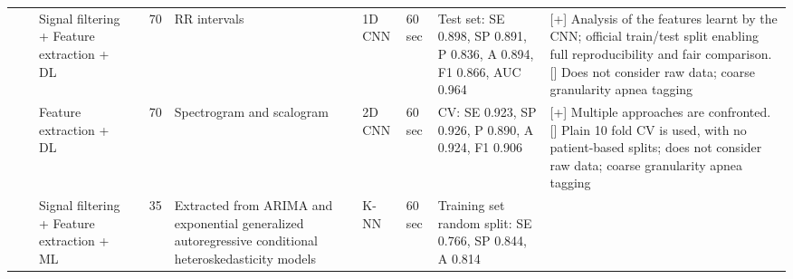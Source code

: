 \documentclass[5p,twocolumn,lefttitle]{elsarticle}
\begin{document}
\begin{table*}[!ht]
{\begin{tabularx}{2\textwidth}{@{}m{2.5em}p{7em}p{10em}lp{2em}p{12em}p{7em}p{3em}p{17em}X@{}}
                            &                                                         & Signal filtering + Feature extraction + DL                     & \cite{shen2021multiscale}                & 70            & RR intervals                                                                                                      & 1D CNN                              & 60 sec                                     & Test set: SE 0.898, SP 0.891, P 0.836, A 0.894, F1 0.866, AUC 0.964                                                                                                                       & [+] Analysis of the features learnt by the CNN; official train/test split enabling full reproducibility and fair comparison. [] Does not consider raw data; coarse granularity apnea tagging                                                                                                                                                                                                                                                           \\
                            
                            \cmidrule(l){3-10} 
                            &                                                         &Feature extraction + DL                     & \cite{10.1371/journal.pone.0250618}                & 70            & Spectrogram and scalogram                                                                                                      & 2D CNN                              & 60 sec                                     & CV: SE 0.923, SP 0.926, P 0.890, A 0.924, F1 0.906
                            
                            & [+]  Multiple approaches are confronted. [] Plain 10 fold CV is used, with no patient-based splits; does not consider raw data; coarse granularity apnea tagging                                                                                                                                                                                                                                                         \\                            \cmidrule(l){3-10} 
                            &                                                         & Signal filtering + Feature extraction + ML                     & \cite{FAAL2021102685}                & 35            & Extracted from ARIMA and exponential generalized autoregressive conditional heteroskedasticity models                                                                                        & K-NN                              & 60 sec                                     & Training set random split: SE 0.766, SP 0.844, A 0.814 
                            

\end{tabularx}}
\end{table*}
\end{document}
